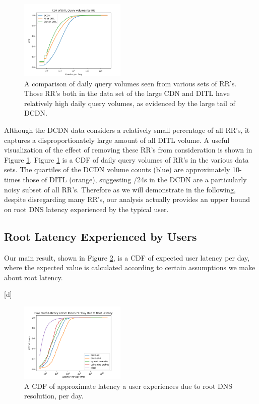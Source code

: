 \documentclass[sigconf,nonacm,10pt]{acmart}
\begin{document}
\begin{figure}
    \centering
    \includegraphics[width=0.45\textwidth]{figures/ditl_volume_comparisons.png}
    \caption{A comparison of daily query volumes seen from various sets of RR's. Those RR's both in the data set of the large CDN and DITL have relatively high daily query volumes, as evidenced by the large tail of DCDN. }
    \label{fig:ditl_volume_comparisons}
\end{figure}

Although the DCDN data considers a relatively small percentage of all
RR's, it captures a disproportionately large amount of all DITL volume.
A useful visualization of the effect of removing these RR's from
consideration is shown in Figure \ref{fig:ditl_volume_comparisons}.
Figure \ref{fig:ditl_volume_comparisons} is a CDF of daily query volumes
of RR's in the various data sets. The quartiles of the DCDN volume
counts (blue) are approximately 10-times those of DITL (orange),
suggesting /24s in the DCDN are a particularly noisy subset of all RR's.
Therefore as we will demonstrate in the following, despite disregarding
many RR's, our analysis actually provides an upper bound on root DNS
latency experienced by the typical user.

\subsection{Root Latency Experienced by
Users}\label{root-latency-experienced-by-users-1}

\label{sec:rr_global_look_analysis} Our main result, shown in Figure
\ref{fig:user_root_latency_per_day}, is a CDF of expected user latency
per day, where the expected value is calculated according to certain
assumptions we make about root latency.

{[}d{]}

\begin{figure}
    \centering
    \includegraphics[width=0.45\textwidth]{figures/user_root_latency_per_day.png}
    \caption{A CDF of approximate latency a user experiences due to root DNS resolution, per day.}
    \label{fig:user_root_latency_per_day}
\end{figure}
\end{document}
